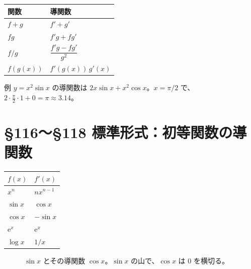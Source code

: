 \documentclass[a4paper,11pt,openany]{ltjsbook}
\newcommand{\ee}{\mathrm{e}}
\begin{document}
\begin{center}
\renewcommand{\arraystretch}{1.5}
\begin{tabular}{ll}
\toprule
関数 & 導関数\\
\midrule
$f+g$ & $f'+g'$\\
$fg$ & $f'g+fg'$\\
$f/g$ & $\dfrac{f'g-fg'}{g^2}$\\
$f(g(x))$ & $f'(g(x))\,g'(x)$\\
\bottomrule
\end{tabular}
\end{center}

\begin{examplebox}{例}
$y=x^2\sin x$ の導関数は $2x\sin x+x^2\cos x$。$x=\pi/2$ で、$2\cdot\frac\pi2\cdot1+0=\pi\approx3.14$。
\end{examplebox}

\section{§116〜§118 標準形式：初等関数の導関数}

\begin{center}
\renewcommand{\arraystretch}{1.4}
\begin{tabular}{ll}
\toprule
$f(x)$ & $f'(x)$\\
\midrule
$x^n$ & $nx^{n-1}$\\
$\sin x$ & $\cos x$\\
$\cos x$ & $-\sin x$\\
$\ee^x$ & $\ee^x$\\
$\log x$ & $1/x$\\
\bottomrule
\end{tabular}
\end{center}

\begin{figure}[htbp]
\centering
{}
\caption{$\sin x$ とその導関数 $\cos x$。$\sin x$ の山で、$\cos x$ は $0$ を横切る。}
\end{figure}
\end{document}
